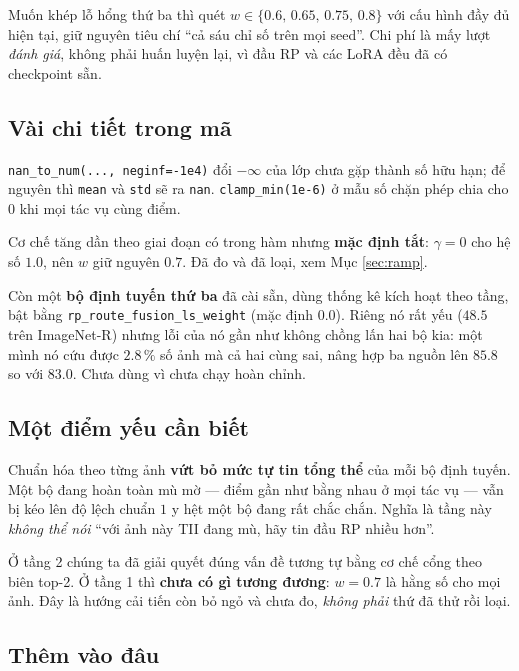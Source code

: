 \documentclass[11pt,a4paper]{article}
\begin{document}
\noindent
Muốn khép lỗ hổng thứ ba thì quét $w \in \{0.6,\, 0.65,\, 0.75,\, 0.8\}$ với cấu
hình đầy đủ hiện tại, giữ nguyên tiêu chí ``cả sáu chỉ số trên mọi seed''. Chi
phí là mấy lượt \emph{đánh giá}, không phải huấn luyện lại, vì đầu RP và các LoRA
đều đã có checkpoint sẵn.

\subsection{Vài chi tiết trong mã}

\texttt{nan\_to\_num(..., neginf=-1e4)} đổi $-\infty$ của lớp chưa gặp thành số
hữu hạn; để nguyên thì \texttt{mean} và \texttt{std} sẽ ra \texttt{nan}.
\texttt{clamp\_min(1e-6)} ở mẫu số chặn phép chia cho 0 khi mọi tác vụ cùng điểm.

Cơ chế tăng dần theo giai đoạn có trong hàm nhưng \textbf{mặc định tắt}:
$\gamma = 0$ cho hệ số $1.0$, nên $w$ giữ nguyên $0.7$. Đã đo và đã loại, xem Mục
\ref{sec:ramp}.

Còn một \textbf{bộ định tuyến thứ ba} đã cài sẵn, dùng thống kê kích hoạt theo
tầng, bật bằng \texttt{rp\_route\_fusion\_ls\_weight} (mặc định $0.0$). Riêng nó
rất yếu ($48.5$ trên ImageNet-R) nhưng lỗi của nó gần như không chồng lấn hai bộ
kia: một mình nó cứu được $2.8\,\%$ số ảnh mà cả hai cùng sai, nâng hợp ba nguồn
lên $85.8$ so với $83.0$. Chưa dùng vì chưa chạy hoàn chỉnh.

\subsection{Một điểm yếu cần biết}
\label{sec:tang1-yeu}

Chuẩn hóa theo từng ảnh \textbf{vứt bỏ mức tự tin tổng thể} của mỗi bộ định
tuyến. Một bộ đang hoàn toàn mù mờ --- điểm gần như bằng nhau ở mọi tác vụ ---
vẫn bị kéo lên độ lệch chuẩn $1$ y hệt một bộ đang rất chắc chắn. Nghĩa là tầng
này \emph{không thể nói} ``với ảnh này TII đang mù, hãy tin đầu RP nhiều hơn''.

Ở tầng 2 chúng ta đã giải quyết đúng vấn đề tương tự bằng cơ chế cổng theo biên
top-2. Ở tầng 1 thì \textbf{chưa có gì tương đương}: $w = 0.7$ là hằng số cho mọi
ảnh. Đây là hướng cải tiến còn bỏ ngỏ và chưa đo, \emph{không phải} thứ đã thử
rồi loại.

\subsection{Thêm vào đâu}
\end{document}
